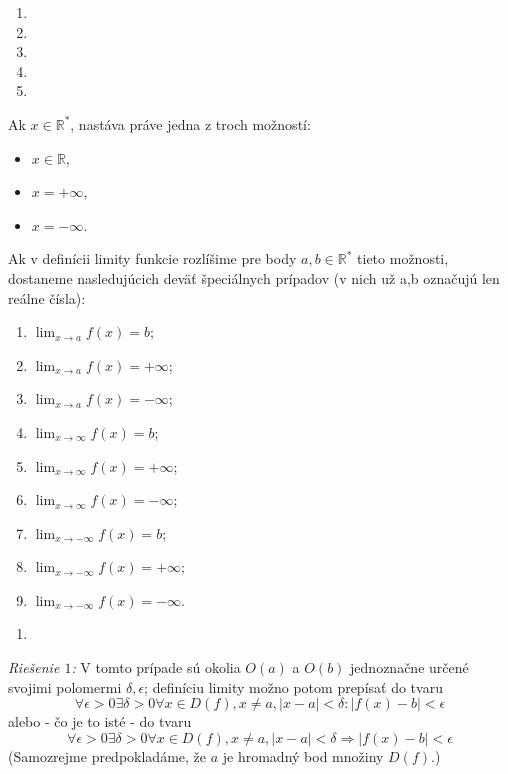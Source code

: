\begin{enumerate}[resume]
	\item {}
	\item {}
	\item {}
	\item {}
	\item {}
\end{enumerate}

Ak $x \in \mathbb{R^*}$, nastáva práve jedna z troch možností:
\begin{itemize}
\item $x \in \mathbb{R}$,
\item $x = +\infty$,
\item $x = -\infty$.
\end{itemize}

Ak v definícii limity funkcie rozlíšime pre body $a,b \in \mathbb{R^*}$ tieto možnosti, dostaneme nasledujúcich deväť špeciálnych prípadov (v nich už a,b označujú len reálne čísla):


\begin{multicols}{3}
\begin{enumerate}
    \item $\lim_{x \rightarrow a} f(x)=b$;
    \item $\lim_{x \rightarrow a} f(x)=+\infty$;
    \item $\lim_{x \rightarrow a} f(x)=-\infty$;
    \item $\lim_{x \rightarrow \infty} f(x)=b$;
    \item $\lim_{x \rightarrow \infty} f(x)=+\infty$;
    \item $\lim_{x \rightarrow \infty} f(x)=-\infty$;
    \item $\lim_{x \rightarrow -\infty} f(x)=b$;
    \item $\lim_{x \rightarrow -\infty} f(x)=+\infty$;
    \item $\lim_{x \rightarrow -\infty} f(x)=-\infty$.
\end{enumerate}
\end{multicols}

\begin{enumerate}[resume]
	\item {}
\end{enumerate}

\textit{Riešenie $1$:}
V tomto prípade sú okolia $O(a)$ a $O(b)$ jednoznačne určené svojimi polomermi $\delta,\epsilon$; definíciu limity možno potom prepísať do tvaru 
$$\forall \epsilon > 0 \exists \delta > 0 \forall x \in D(f), x \neq a, |x-a|<\delta:|f(x)-b|<\epsilon$$
alebo - čo je to isté - do tvaru
$$\forall \epsilon > 0 \exists \delta > 0 \forall x \in D(f), x \neq a, |x-a|<\delta \Rightarrow |f(x)-b|<\epsilon$$
(Samozrejme predpokladáme, že $a$ je hromadný bod množiny $D(f)$.)

